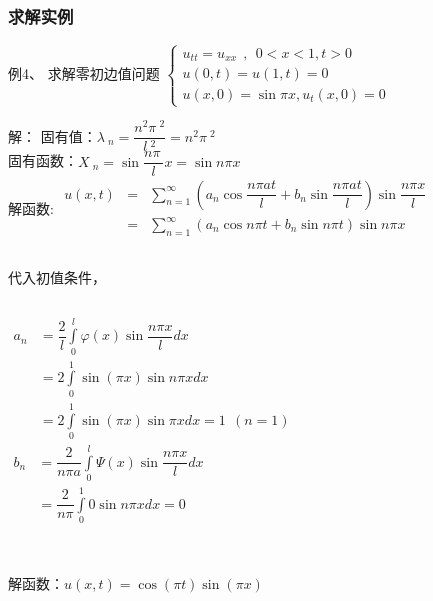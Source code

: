 \begin{frame}
	\frametitle{求解实例}	
	\begin{exampleblock} {例4、	求解零初边值问题}
	$\displaystyle  \begin{cases}
		u_{tt} =u_{xx} ~~,~~ 0<x<1, t>0\\
		u(0,t) =u(1,t)=0 \\
		u(x,0) =\sin \pi x, u_t (x,0)=0 
	\end{cases}$ \\	
	\end{exampleblock} 	
	\alert{解：}
	固有值：$\displaystyle  \lambda~_n=\dfrac{n^2\pi~^2}{l~^2 }= n^2\pi~^2 $ \\ 
	固有函数：$\displaystyle  X~_n= \sin \dfrac{n\pi~}{l} x= \sin n\pi x $\\
	解函数:
	$\begin{array}{llll}
		u(x,t)&=& \sum\limits_{n=1}^{\infty }  (a_n\cos\dfrac{ n\pi at}{l}+ b_n\sin \dfrac{ n\pi at}{l}) \sin \dfrac{ n\pi x}{l}\\
		&= &\sum\limits_{n=1}^{\infty }  (a_n\cos n\pi t+ b_n\sin n\pi t ) \sin n\pi x \\
	\end{array}$ \\ 
\end{frame}	

\begin{frame}
	\frametitle{}	
	代入初值条件，
	\begin{columns}[T,onlytextwidth]
		$\begin{array}{lllllllll}
			a_n&=  \dfrac{2}{l} \int\limits_{0 }^{l}  \varphi (x) \sin \dfrac{ n\pi x}{l} dx \\
			&= 2 \int\limits_{0 }^{1}  \sin(\pi x) \sin n\pi x dx \\
			&= 2 \int\limits_{0 }^{1}  \sin(\pi x) \sin \pi x dx =1~~  (n=1)   
		\end{array}$ \\ 
	
		$\begin{array}{lllllllll}
			b_n&= \dfrac{2} { n\pi a} \int\limits_{0 }^{l}  \Psi  (x) \sin \dfrac{ n\pi x}{l} dx  \\
			&= \dfrac{2} { n\pi} \int\limits_{0 }^{1}  0  \sin n\pi x dx  =0
		\end{array}$ \\  
	  \end{columns} 
	  ~~\\ \vspace{0.3em}
	解函数：$\displaystyle  u(x,t) = \cos(\pi t) \sin(\pi x)   $\\
\end{frame}	

